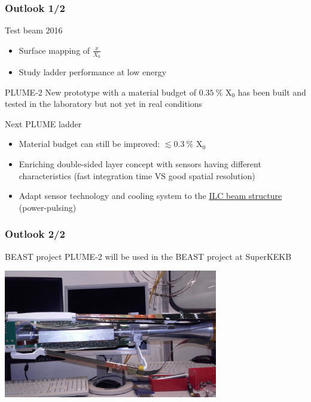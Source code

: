 \documentclass{beamer}
\begin{document}
\begin{frame}
  \frametitle{Outlook 1/2}

  \vspace{-0.25cm}
  \begin{block}{Test beam 2016}
    \begin{itemize}
      \item Surface mapping of $\frac{x}{X_0}$
      \item Study ladder performance at low energy
    \end{itemize}
  \end{block}

  \vspace{-0.15cm}
  \begin{block}{PLUME-2}
    New prototype with a material budget of $0.35~\%$ X$_0$ has been built and tested in the laboratory but not yet in real conditions
  \end{block}

  \vspace{-0.15cm}
  \begin{block}{Next PLUME ladder}
    \begin{itemize}
      \item Material budget can still be improved: $\lesssim 0.3~\%$ X$_0$
      \item Enriching double-sided layer concept with sensors having different characteristics (fast integration time VS good spatial resolution)
      \item Adapt sensor technology and cooling system to the \hyperlink{power-pulsing}{ILC beam structure} (power-pulsing)
    \end{itemize}
  \end{block}


\end{frame}

\begin{frame}
  \frametitle{Outlook 2/2}

    \begin{block}{BEAST project}
    PLUME-2 will be used in the BEAST project at SuperKEKB
    \vspace{-0.2cm}
    \begin{center}
      \includegraphics[width = 0.7\textwidth]{Pictures/plumeInTableDesySetup.jpg}
    \end{center}
  \end{block}
\end{frame}
\end{document}
